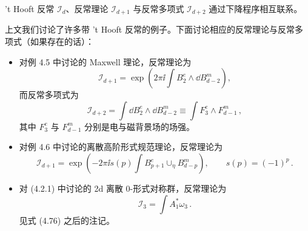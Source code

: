 
't Hooft 反常 $\mathcal{I}_d$、反常理论 $\mathcal{I}_{d+1}$ 与反常多项式 $\mathcal{I}_{d+2}$ 通过下降程序相互联系。

上文我们讨论了许多带 't Hooft 反常的例子。下面讨论相应的反常理论与反常多项式（如果存在的话）：

\begin{itemize}[leftmargin=1.4em,itemsep=1pt,topsep=1pt]
\item 对例 4.5 中讨论的 Maxwell 理论，反常理论为
\begin{equation}
\mathcal{I}_{d+1}=\exp\left(2\pi\ii\int B_2^e\wedge\dd B^m_{d-2}\right),
\tag{4.92}
\end{equation}
而反常多项式为
\begin{equation}
\mathcal{I}_{d+2}=\int \dd B_2^e\wedge \dd B^m_{d-2}\equiv\int F_3^e\wedge F^m_{d-1}\,,
\tag{4.93}
\end{equation}
其中 $F_3^e$ 与 $F^m_{d-1}$ 分别是电与磁背景场的场强。

\item 对例 4.6 中讨论的离散高阶形式规范理论，反常理论为
\begin{equation}
\mathcal{I}_{d+1}=\exp\left(-2\pi\ii s(p)\int B^e_{p+1}\cup_\eta B^m_{d-p}\right),\qquad s(p)=(-1)^p\,.
\tag{4.94}
\end{equation}

\item 对 (4.2.1) 中讨论的 2d 离散 0-形式对称群，反常理论为
\begin{equation}
\mathcal{I}_3=\int A_1^*\omega_3\,.
\tag{4.95}
\end{equation}
见式 (4.76) 之后的注记。
\end{itemize}


